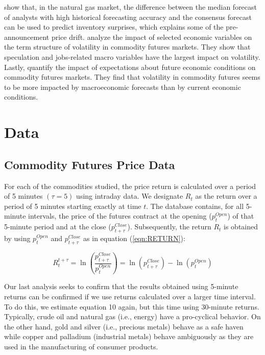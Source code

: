 \documentclass[12pt]{article}
\begin{document}
\citet{gu2018drives} show that, in the natural gas market, the difference between the median forecast of analysts with high historical forecasting accuracy and the consensus forecast can be used to predict inventory surprises, which explains some of the pre-announcement price drift.  \citet{hollstein2020volatility} analyze the impact of selected economic variables on the term structure of volatility in commodity futures markets. They show that speculation and jobs-related macro variables have the largest impact on volatility. Lastly, \citet{ye2021macroeconomic} quantify the impact of expectations about future economic conditions on commodity futures markets. They find that volatility in commodity futures seems to be more impacted by macroeconomic forecasts than by current economic conditions. 


\section{Data}
\subsection{Commodity Futures Price Data}
For each of the commodities studied, the price return is calculated over a period of 5 minutes $(\tau=5)$ using intraday data. We designate $R_t$ as the return over a period of 5 minutes starting exactly at time $t$. The database contains, for all 5-minute intervals, the price of the futures contract at the opening ($p_{t}^{Open}$) of that 5-minute period and at the close ($p_{t+\tau}^{Close}$). Subsequently, the return $R_t$ is obtained by using $p_{t}^{Open}$ and $p_{t+\tau}^{Close}$ as in equation (\ref{eqn:RETURN}):

\begin{equation}\label{eqn:RETURN}
R_t^{t+\tau}=\ln \left( \frac{p_{t+\tau}^{Close}}{p_{t}^{Open}} \right)=\ln (p_{t+\tau}^{Close})-\ln(p_{t}^{Open})
\end{equation}

Our last analysis seeks to confirm that the results obtained using 5-minute returns can be confirmed if we use returns calculated over a larger time interval. To do this, we estimate equation 10 again, but this time using 30-minute returns.
Typically, crude oil and natural gas (i.e., energy) have a pro-cyclical behavior. On the other hand, gold and silver (i.e., precious metals) behave as a safe haven while copper and palladium (industrial metals) behave ambiguously as they are used in the manufacturing of consumer products.
\end{document}

